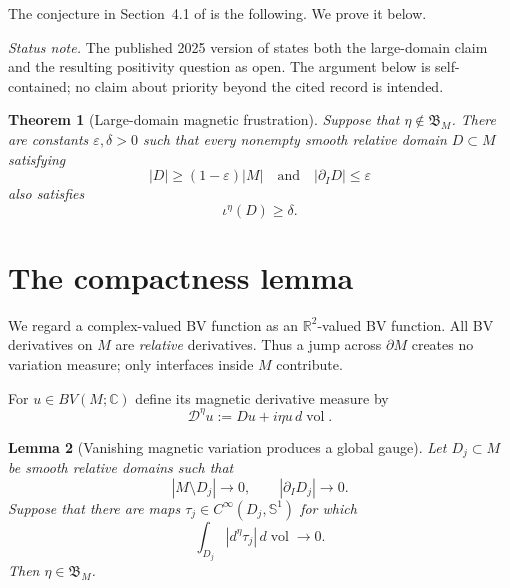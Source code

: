 \documentclass[11pt]{amsart}
\newtheorem{theorem}{Theorem}[section]
\newtheorem{lemma}[theorem]{Lemma}
\newcommand{\Sph}{\mathbb S^1}
\newcommand{\vol}{\operatorname{vol}}
\newcommand{\Bspace}{\mathfrak B}
\newcommand{\frust}{\iota}
\begin{document}
The conjecture in Section~4.1 of \cite{CGHP} is the following.  We prove it
below.

\smallskip
\noindent\emph{Status note.}
The published 2025 version of \cite{CGHP} states both the large-domain claim
and the resulting positivity question as open.  The argument below is
self-contained; no claim about priority beyond the cited record is intended.

\begin{theorem}[Large-domain magnetic frustration]\label{thm:large-domain}
Suppose that $\eta\notin\Bspace_M$.  There are constants
$\varepsilon,\delta>0$ such that every nonempty smooth relative domain
$D\subset M$ satisfying
\[
 |D|\geq(1-\varepsilon)|M|
 \quad\text{and}\quad
 |\partial_I D|\leq\varepsilon
\]
also satisfies
\[
 \frust^\eta(D)\geq\delta.
\]
\end{theorem}

\section{The compactness lemma}

We regard a complex-valued BV function as an $\mathbb R^2$-valued BV
function.  All BV derivatives on $M$ are \emph{relative} derivatives.  Thus a
jump across $\partial M$ creates no variation measure; only interfaces inside
$M$ contribute.

For $u\in BV(M;\mathbb C)$ define its magnetic derivative measure by
\[
  \mathcal D^\eta u:=Du+i\eta u\,d\vol.
\]

\begin{lemma}[Vanishing magnetic variation produces a global gauge]
\label{lem:compactness}
Let $D_j\subset M$ be smooth relative domains such that
\[
 |M\setminus D_j|\longrightarrow0,
 \qquad
 |\partial_I D_j|\longrightarrow0.
\]
Suppose that there are maps $\tau_j\in C^\infty(D_j,\Sph)$ for which
\[
 \int_{D_j}|d^\eta\tau_j|\,d\vol\longrightarrow0.
\]
Then $\eta\in\Bspace_M$.
\end{lemma}
\end{document}
